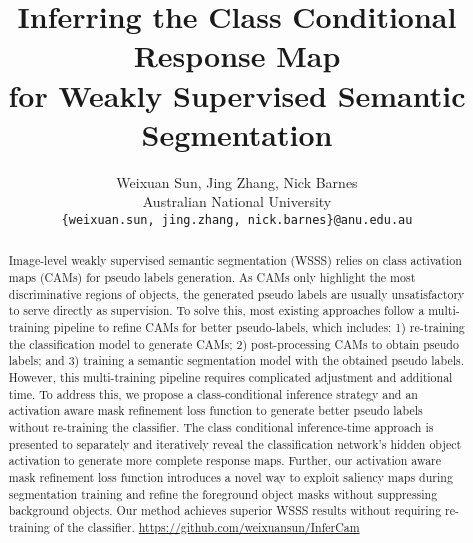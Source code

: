 \documentclass[10pt,twocolumn,letterpaper]{article}
\begin{document}
\title{Inferring the Class Conditional Response Map \\for Weakly Supervised Semantic Segmentation}

\author{Weixuan Sun,   Jing Zhang,   Nick Barnes\\
Australian National University\\
{\tt\small \{weixuan.sun, jing.zhang, nick.barnes\}@anu.edu.au}
}

\maketitle







\begin{abstract}
Image-level weakly supervised semantic segmentation (WSSS) relies on class activation maps (CAMs) for pseudo labels generation. As CAMs
only highlight the most discriminative regions of objects, the generated pseudo labels are usually unsatisfactory to serve directly as supervision. To solve this, most existing approaches follow a multi-training pipeline to refine CAMs for better pseudo-labels, which includes: 1) re-training the classification model to generate CAMs; 2) post-processing CAMs to obtain pseudo labels; and 3) training a semantic segmentation model with the obtained pseudo labels. However, this multi-training pipeline requires complicated adjustment and additional time. To address this, we propose a class-conditional inference strategy and an activation aware mask refinement loss function to generate better pseudo labels without re-training the classifier. The class conditional inference-time approach is presented to separately and iteratively
reveal the classification network's hidden object activation to generate more complete response maps. Further, our activation aware mask refinement loss function introduces a novel way to exploit saliency maps during segmentation training and refine the foreground object masks without suppressing background objects.
Our method achieves superior WSSS results without requiring re-training of the classifier. \url{https://github.com/weixuansun/InferCam}


\end{abstract}
\vspace{-5mm}
\end{document}
